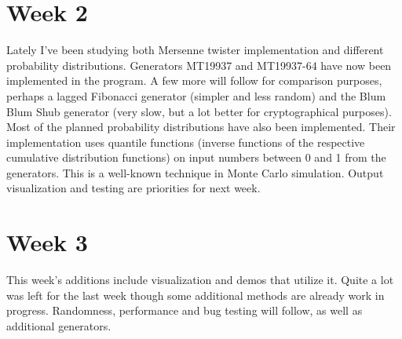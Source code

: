\documentclass[reprint,aip]{revtex4-1}
\begin{document}
\section{Week 2}

Lately I've been studying both Mersenne twister implementation and different probability distributions. Generators MT19937 and MT19937-64 have now been implemented in the program. A few more will follow for comparison purposes, perhaps a lagged Fibonacci generator (simpler and less random) and the Blum Blum Shub generator (very slow, but a lot better for cryptographical purposes). Most of the planned probability distributions have also been implemented. Their implementation uses quantile functions (inverse functions of the respective cumulative distribution functions) on input numbers between 0 and 1 from the generators. This is a well-known technique in Monte Carlo simulation. Output visualization and testing are priorities for next week.

\section{Week 3}

This week's additions include visualization and demos that utilize it. Quite a lot was left for the last week though some additional methods are already work in progress. Randomness, performance and bug testing will follow, as well as additional generators.
\end{document}
